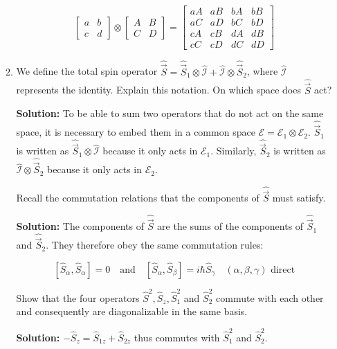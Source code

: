 \documentclass{article}
\begin{document}
\begin{enumerate}
\begin{enumerate}
{\[
\left[\begin{array}{ll}
a & b \\
c & d
\end{array}\right] \otimes \left[\begin{array}{cc}
A & B \\
C & D
\end{array}\right] = \left[\begin{array}{cccc}
a A & a B & b A & b B \\
a C & a D & b C & b D \\
c A & c B & d A & d B \\
c C & c D & d C & d D
\end{array}\right]
\]}


    \item We define the total spin operator \(\hat{\vec{S}} = \hat{\vec{S}}_{1} \otimes \hat{\mathcal{I}} + \hat{\mathcal{I}} \otimes \hat{\vec{S}}_{2}\), where \(\hat{\mathcal{I}}\) represents the identity. Explain this notation. On which space does \(\hat{\vec{S}}\) act?

    {\color{red}\textbf{Solution:} To be able to sum two operators that do not act on the same space, it is necessary to embed them in a common space \(\mathcal{E} = \mathcal{E}_{1} \otimes \mathcal{E}_{2}\). \(\hat{\vec{S}}_{1}\) is written as \(\hat{\vec{S}}_{1} \otimes \hat{\mathcal{I}}\) because it only acts in \(\mathcal{E}_{1}\). Similarly, \(\hat{\vec{S}}_{2}\) is written as \(\hat{\mathcal{I}} \otimes \hat{\vec{S}}_{2}\) because it only acts in \(\mathcal{E}_{2}\).

    Recall the commutation relations that the components of \(\hat{\vec{S}}\) must satisfy.

    \textbf{Solution:} The components of \(\hat{\vec{S}}\) are the sums of the components of \(\hat{\vec{S}}_{1}\) and \(\hat{\vec{S}}_{2}\). They therefore obey the same commutation rules:

    \[
    \left[\hat{S}_{\alpha}, \hat{S}_{\alpha}\right] = 0 \quad \text{and} \quad \left[\hat{S}_{\alpha}, \hat{S}_{\beta}\right] = i \hbar \hat{S}_{\gamma} \quad (\alpha, \beta, \gamma) \text{ direct}
    \]

    Show that the four operators \(\hat{S}^{2}, \hat{S}_{z}, \hat{S}_{1}^{2}\) and \(\hat{S}_{2}^{2}\) commute with each other and consequently are diagonalizable in the same basis.

    \textbf{Solution:} \(-\hat{S}_{z} = \hat{S}_{1 z} + \hat{S}_{2 z}\) thus commutes with \(\hat{S}_{1}^{2}\) and \(\hat{S}_{2}^{2}\).

}
\end{enumerate}
\end{enumerate}
\end{document}
